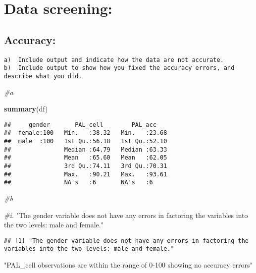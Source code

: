 \documentclass[
]{article}
\newenvironment{Shaded}{\begin{snugshade}}{\end{snugshade}}
\newcommand{\CommentTok}[1]{\textcolor[rgb]{0.56,0.35,0.01}{\textit{#1}}}
\newcommand{\KeywordTok}[1]{\textcolor[rgb]{0.13,0.29,0.53}{\textbf{#1}}}
\newcommand{\NormalTok}[1]{#1}
\newcommand{\StringTok}[1]{\textcolor[rgb]{0.31,0.60,0.02}{#1}}
\begin{document}
\hypertarget{data-screening}{%
\section{Data screening:}\label{data-screening}}

\hypertarget{accuracy}{%
\subsection{Accuracy:}\label{accuracy}}

\begin{verbatim}
a)  Include output and indicate how the data are not accurate.
b)  Include output to show how you fixed the accuracy errors, and describe what you did.
\end{verbatim}

\begin{Shaded}
\begin{Highlighting}[]
\CommentTok{#a}

\KeywordTok{summary}\NormalTok{(df)}
\end{Highlighting}
\end{Shaded}

\begin{verbatim}
##     gender       PAL_cell        PAL_acc     
##  female:100   Min.   :38.32   Min.   :23.68  
##  male  :100   1st Qu.:56.18   1st Qu.:52.10  
##               Median :64.79   Median :63.33  
##               Mean   :65.60   Mean   :62.05  
##               3rd Qu.:74.11   3rd Qu.:70.31  
##               Max.   :90.21   Max.   :93.61  
##               NA's   :6       NA's   :6
\end{verbatim}

\begin{Shaded}
\begin{Highlighting}[]
\CommentTok{#b}

\CommentTok{#i.}
\StringTok{"The gender variable does not have any errors in factoring the variables into the two levels: male and female."}
\end{Highlighting}
\end{Shaded}

\begin{verbatim}
## [1] "The gender variable does not have any errors in factoring the variables into the two levels: male and female."
\end{verbatim}

\begin{Shaded}
\begin{Highlighting}[]
\StringTok{"PAL_cell observations are within the range of 0-100 showing no accuracy errors"}
\end{Highlighting}
\end{Shaded}
\end{document}
